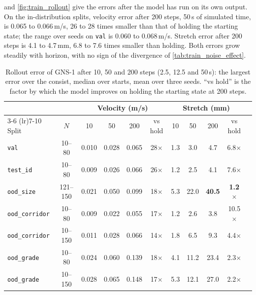  and \cref{fig:train_rollout} give the errors after the model has run on its own output. On the in-distribution splits, velocity error after 200 steps, 50\,s of simulated time, is 0.065 to 0.066\,m/s, 26 to 28 times smaller than that of holding the starting state; the range over seeds on \texttt{val} is 0.060 to 0.068\,m/s. Stretch error after 200 steps is 4.1 to 4.7\,mm, 6.8 to 7.6 times smaller than holding. Both errors grow steadily with horizon, with no sign of the divergence of \cref{tab:train_noise_effect}.

\begin{table}[htbp]
    \centering
    \small
    \setlength{\tabcolsep}{4pt}
    \begin{tabular}{lcccccccccc}
        \toprule
        & & \multicolumn{4}{c}{Velocity (m/s)} & \multicolumn{4}{c}{Stretch (mm)} \\
        \cmidrule(lr){3-6} \cmidrule(lr){7-10}
        Split & $N$ & 10 & 50 & 200 & vs hold & 10 & 50 & 200 & vs hold \\
        \midrule
        \texttt{val}           & 10--80   & 0.010 & 0.028 & 0.065 & 28$\times$ & 1.3 & 3.0 & 4.7 & 6.8$\times$ \\
        \texttt{test\_id}      & 10--80   & 0.009 & 0.026 & 0.066 & 26$\times$ & 1.2 & 2.5 & 4.1 & 7.6$\times$ \\
        \midrule
        \texttt{ood\_size}     & 121--150 & 0.021 & 0.050 & 0.099 & 18$\times$ & 5.3 & 22.0 & \textbf{40.5} & \textbf{1.2$\times$} \\
        \texttt{ood\_corridor} & 10--80   & 0.009 & 0.022 & 0.055 & 17$\times$ & 1.2 & 2.6 & 3.8 & 10.5$\times$ \\
        \texttt{ood\_corridor} & 10--150  & 0.011 & 0.028 & 0.066 & 14$\times$ & 1.8 & 6.5 & 9.3 & 4.4$\times$ \\
        \texttt{ood\_grade}    & 10--80   & 0.024 & 0.060 & 0.139 & 18$\times$ & 4.1 & 11.2 & 23.4 & 2.3$\times$ \\
        \texttt{ood\_grade}    & 10--150  & 0.028 & 0.065 & 0.148 & 17$\times$ & 5.3 & 12.1 & 27.0 & 2.2$\times$ \\
        \bottomrule
    \end{tabular}
    \caption{Rollout error of GNS-1 after 10, 50 and 200 steps (2.5, 12.5 and 50\,s): the largest error over the consist, median over starts, mean over three seeds. ``vs hold'' is the factor by which the model improves on holding the starting state at 200 steps.}
    \label{tab:train_rollout}
\end{table}

